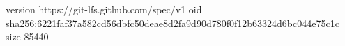 version https://git-lfs.github.com/spec/v1
oid sha256:6221faf37a582cd56dbfc50deae8d2fa9d90d780f0f12b63324d6bc044e75c1c
size 85440

